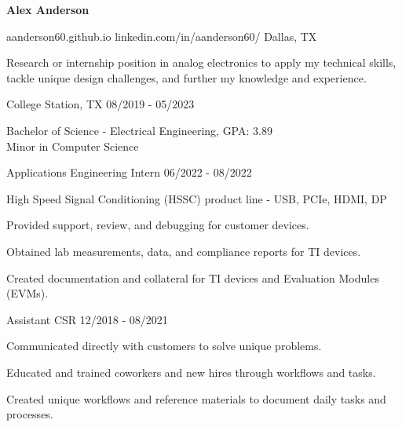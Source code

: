 \documentclass[11pt]{article}
\begin{document}
\centerline{{\Huge \bf Alex Anderson}}

\bigskip

        {aanderson60.github.io}
        {linkedin.com/in/aanderson60/}
        {Dallas, TX}

Research or internship position in analog electronics to apply my technical skills, tackle unique design challenges, and further my knowledge and experience.


\begin{description}
\squish
{}
            {College Station, TX}
            {08/2019 - 05/2023}

Bachelor of Science - Electrical Engineering, GPA: 3.89\\
Minor in Computer Science 

\end{description}


\begin{description}
      \squish
                 {Applications Engineering Intern}
                 {06/2022 - 08/2022}
      
      High Speed Signal Conditioning (HSSC) product line - USB, PCIe, HDMI, DP
      
      Provided support, review, and debugging for customer devices.
      
      Obtained lab measurements, data, and compliance reports for TI devices.
      
      Created documentation and collateral for TI devices and Evaluation Modules (EVMs).
      
\end{description}

\begin{description}
\squish
{}
           {Assistant CSR}
           {12/2018 - 08/2021}

Communicated directly with customers to solve unique problems.

Educated and trained coworkers and new hires through workflows and tasks.

Created unique workflows and reference materials to document daily tasks and processes.

\end{description}
\end{document}
